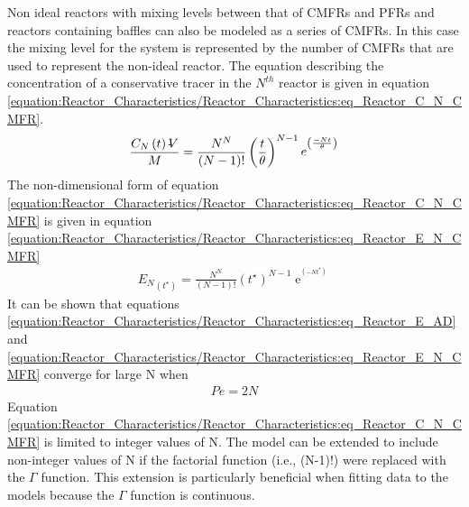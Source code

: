 \documentclass[letterpaper,10pt,english]{sphinxmanual}
\begin{document}
Non ideal reactors with mixing levels between that of CMFRs and PFRs and reactors containing baffles can also be modeled as a series of CMFRs. In this case the mixing level for the system is represented by the number of CMFRs that are used to represent the non-ideal reactor. The equation describing the concentration of a conservative tracer in the \(N^{th}\) reactor is given in equation \eqref{equation:Reactor_Characteristics/Reactor_Characteristics:eq_Reactor_C_N_CMFR}.
\begin{equation}\label{equation:Reactor_Characteristics/Reactor_Characteristics:eq_Reactor_C_N_CMFR}
\begin{split}\frac{C_{N} \left(t\right)\rlap{-} V }{M} =\frac{N^N}{\left(N-1\right)!} \left(\frac{t}{\theta} \right)^{N-1} {\mathop{e}\nolimits^{{}^{\left(\frac{-Nt}{\theta} \right)} }}\end{split}
\end{equation}
The non-dimensional form of equation \eqref{equation:Reactor_Characteristics/Reactor_Characteristics:eq_Reactor_C_N_CMFR} is given in equation \eqref{equation:Reactor_Characteristics/Reactor_Characteristics:eq_Reactor_E_N_CMFR}
\begin{equation}\label{equation:Reactor_Characteristics/Reactor_Characteristics:eq_Reactor_E_N_CMFR}
\begin{split}{E_{N}}_{\left(t^{\star} \right)} = \frac{N^N}{\left(N-1\right)!} \left(t^{\star} \right)^{N-1} {\mathop{e}\nolimits^{{}^{\left(-Nt^{\star} \right)} }}\end{split}
\end{equation}
It can be shown that equations \eqref{equation:Reactor_Characteristics/Reactor_Characteristics:eq_Reactor_E_AD} and \eqref{equation:Reactor_Characteristics/Reactor_Characteristics:eq_Reactor_E_N_CMFR} converge for large N when
\begin{equation}\label{equation:Reactor_Characteristics/Reactor_Characteristics:Reactor_Characteristics/Reactor_Characteristics:10}
\begin{split}Pe=2N\end{split}
\end{equation}
Equation \eqref{equation:Reactor_Characteristics/Reactor_Characteristics:eq_Reactor_C_N_CMFR} is limited to integer values of N. The model can be extended to include non-integer values of N if the factorial function (i.e., (N-1)!) were replaced with the \(\Gamma\) function. This extension is particularly beneficial when fitting data to the models because the \(\Gamma\) function is continuous.
\end{document}

